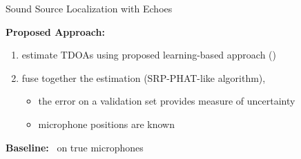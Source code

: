 \begin{frame}{Sound Source Localization \alert{with Echoes} \hfill\faMapMarked*}
    \pause
    \begin{mycontriblock}
        \textbf{Proposed Approach:}
        \begin{enumerate}
            \item estimate \alert{TDOAs} using proposed learning-based approach (\MLP)
            \item fuse together the estimation (SRP-PHAT-like algorithm\footnotemark[1]),
            \begin{itemize}
                \item the error on a validation set provides measure of uncertainty
                \item microphone positions are known
            \end{itemize}
        \end{enumerate}
    \end{mycontriblock}

    \pause
    \vspace{1mm}
    \begin{mysotablock}
        \textbf{Baseline:} \GCCPHAT~on true microphones\footnotemark[2]
    \end{mysotablock}

    \vspace{1mm}

\end{frame}

